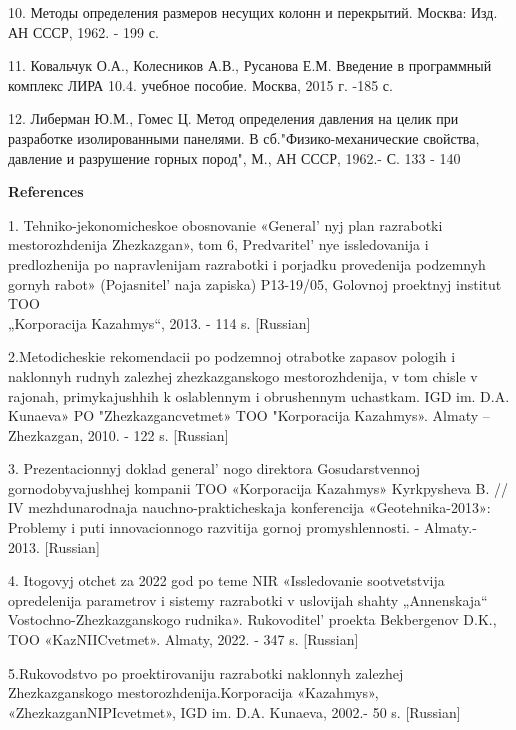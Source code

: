 \begin{references}
10. Методы определения размеров несущих колонн и перекрытий. Москва:
Изд. АН СССР, 1962. - 199 с.

11. Ковальчук О.А., Колесников А.В., Русанова Е.М. Введение в
программный комплекс ЛИРА 10.4. учебное пособие. Москва, 2015 г. -185 с.

12. Либерман Ю.М., Гомес Ц. Метод определения давления на целик при
разработке изолированными панелями. В сб."Физико-механические свойства,
давление и разрушение горных пород", М., АН СССР, 1962.- С. 133 - 140
\end{references}

\begin{center}
{\bfseries References}
\end{center}

\begin{references}
1. Tehniko-jekonomicheskoe obosnovanie «General' nyj plan
razrabotki mestorozhdenija Zhezkazgan», tom 6,
Predvaritel' nye issledovanija i predlozhenija po
napravlenijam razrabotki i porjadku provedenija podzemnyh gornyh rabot»
(Pojasnitel' naja zapiska) P13-19/05, Golovnoj proektnyj
institut TOO\\ „Korporacija Kazahmys``, 2013. - 114 s. {[}Russian{]}

2.Metodicheskie rekomendacii po podzemnoj otrabotke zapasov pologih i
naklonnyh rudnyh zalezhej zhezkazganskogo mestorozhdenija, v tom chisle
v rajonah, primykajushhih k oslablennym i obrushennym uchastkam. IGD im.
D.A. Kunaeva» PO "Zhezkazgancvetmet» TOO "Korporacija Kazahmys». Almaty
-- Zhezkazgan, 2010. - 122 s. {[}Russian{]}

3. Prezentacionnyj doklad general' nogo direktora
Gosudarstvennoj gornodobyvajushhej kompanii TOO \linebreak«Korporacija Kazahmys»
Kyrkpysheva B. // IV mezhdunarodnaja nauchno-prakticheskaja konferencija
«Geotehnika-2013»: Problemy i puti innovacionnogo razvitija gornoj
promyshlennosti. - Almaty.- 2013. {[}Russian{]}

4. Itogovyj otchet za 2022 god po teme NIR «Issledovanie sootvetstvija
opredelenija parametrov i sistemy razrabotki v uslovijah shahty
„Annenskaja`` Vostochno-Zhezkazganskogo rudnika».
Rukovoditel'{} proekta Bekbergenov D.K., TOO
«KazNIICvetmet». Almaty, 2022. - 347 s. {[}Russian{]}

5.Rukovodstvo po proektirovaniju razrabotki naklonnyh zalezhej
Zhezkazganskogo mestorozhdenija.\linebreak Korporacija «Kazahmys»,
«ZhezkazganNIPIcvetmet», IGD im. D.A. Kunaeva, 2002.- 50 s.
{[}Russian{]}


\end{references}
